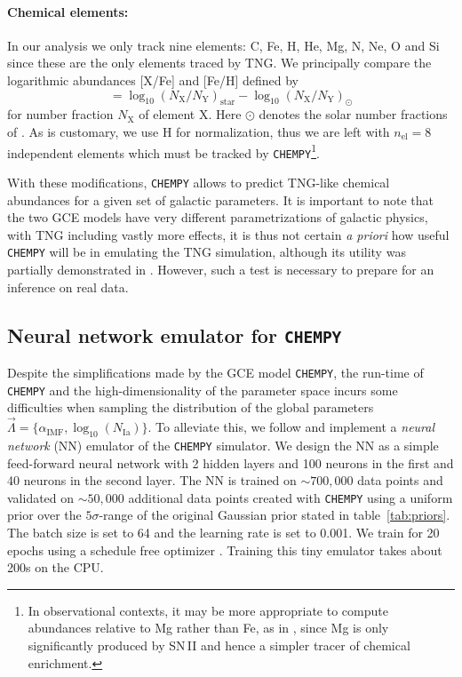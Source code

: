 \documentclass{aa}
\begin{document}
\paragraph{Chemical elements:}
In our analysis we only track nine elements: C, Fe, H, He, Mg, N, Ne, O and Si since these are the only elements traced by TNG. We principally compare the logarithmic abundances [X/Fe] and [Fe/H] defined by 
\begin{equation}
     [\mathrm{X}/\mathrm{Y}] = \log_{10}(N_\mathrm X/N_\mathrm Y)_\mathrm{star} - \log_{10}(N_\mathrm X/N_\mathrm Y)_\odot
\end{equation}
for number fraction $N_\mathrm X$ of element X. Here $\odot$ denotes the solar number fractions of \citet{2009ARA&A..47..481A}. As is customary, we use H for normalization, thus we are left with $n_\mathrm{el}=8$ independent elements which must be tracked by \texttt{CHEMPY}\footnote{In observational contexts, it may be more appropriate to compute abundances relative to Mg rather than Fe, as in \citep{2019ApJ...874..102W}, since Mg is only significantly produced by SN\,II and hence a simpler tracer of chemical enrichment.}. 

With these modifications, \texttt{CHEMPY} allows to predict TNG-like chemical abundances for a given set of galactic parameters. It is important to note that the two GCE models have very different parametrizations of galactic physics, with TNG including vastly more effects, it is thus not certain \textit{a priori} how useful \texttt{CHEMPY} will be in emulating the TNG simulation, although its utility was partially demonstrated in \citet{2018ApJ...861...40P}. However,  such a test is necessary to prepare for an inference on real data.


\subsection{Neural network emulator for \texttt{CHEMPY}}
Despite the simplifications made by the GCE model \texttt{CHEMPY}, the run-time of \texttt{CHEMPY} and the high-dimensionality of the parameter space incurs some difficulties when sampling the distribution of the global parameters $\vec\Lambda = \{\alpha_\mathrm{IMF},\log_{10}(N_\mathrm{Ia})\}$. 
To alleviate this, we follow \cite{Philcox_2019} and implement a \textit{neural network} (NN) emulator of the \texttt{CHEMPY} simulator. We design the NN as a simple feed-forward neural network with 2 hidden layers and 100 neurons in the first and 40 neurons in the second layer. The NN is trained on $\sim700,000$ data points and validated on $\sim50,000$ additional data points created with \texttt{CHEMPY} using a uniform prior over the $5\sigma$-range of the original Gaussian prior stated in table~\ref{tab:priors}. The batch size is set to 64 and the learning rate is set to 0.001. We train for 20 epochs using a schedule free optimizer \citep{schedulefree}. 
Training this tiny emulator takes about 200s on the CPU.
\end{document}
